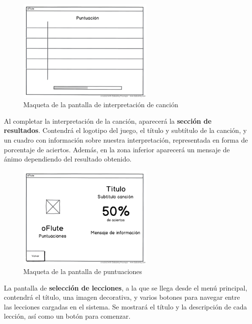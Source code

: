 \begin{figure}[h!]
  \centering
  \includegraphics[width=0.6\textwidth]{4_analisis/imagen_mockup_reproducir_cancion}
  \caption{Maqueta de la pantalla de interpretación de canción}
\end{figure}

\pagebreak

Al completar la interpretación de la canción, aparecerá la \textbf{sección de
  resultados}. Contendrá el logotipo del juego, el título y subtítulo de la
canción, y un cuadro con información sobre nuestra interpretación, representada
en forma de porcentaje de aciertos. Además, en la zona inferior aparecerá un
mensaje de ánimo dependiendo del resultado obtenido.

\begin{figure}[h!]
  \centering
  \includegraphics[width=0.6\textwidth]{4_analisis/imagen_mockup_puntuaciones}
  \caption{Maqueta de la pantalla de puntuaciones}
\end{figure}

La pantalla de \textbf{selección de lecciones}, a la que se llega desde el menú
principal, contendrá el título, una imagen decorativa, y varios botones para
navegar entre las lecciones cargadas en el sistema. Se mostrará el título y la
descripción de cada lección, así como un botón para comenzar.

